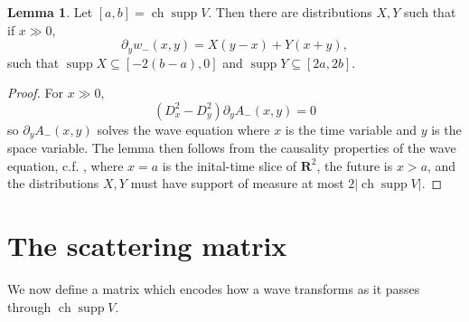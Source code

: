 \documentclass[12pt]{report}
\newcommand{\RR}{\mathbf{R}}
\DeclareMathOperator{\ch}{ch}
\DeclareMathOperator{\supp}{supp}
\theoremstyle{definition}
\newtheorem{lemma}[theorem]{Lemma}
\begin{document}
\begin{lemma}
\label{construction of intertwining, part 2}
Let $[a, b] = \ch \supp V$. Then there are distributions $X,Y$ such that if $x \gg 0$,
$$\partial_yw_-(x, y) = X(y - x) + Y(x + y),$$
such that $\supp X \subseteq [-2(b-a), 0]$ and $\supp Y \subseteq [2a, 2b]$.
\end{lemma}
\begin{proof}
For $x \gg 0$,
$$(D_x^2 - D_y^2)\partial_yA_-(x, y) = 0$$
so $\partial_yA_-(x, y)$ solves the wave equation where $x$ is the time variable and $y$ is the space variable. The lemma then follows from the causality properties of the wave equation, c.f. \cite[\S2.4.1a]{evans10}, where $x = a$ is the inital-time slice of $\RR^2$, the future is $x > a$, and the distributions $X,Y$ must have support of measure at most $2|\ch \supp V|$.
\end{proof}



\section{The scattering matrix}
We now define a matrix which encodes how a wave transforms as it passes through $\ch \supp V$.
\end{document}
